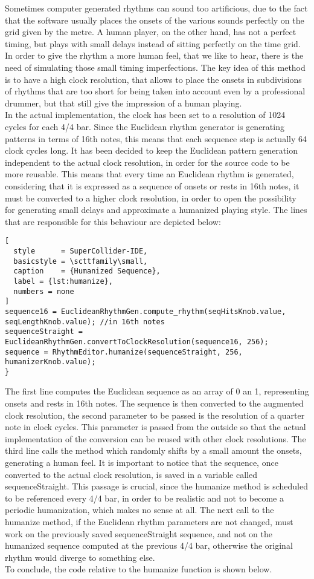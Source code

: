 \documentclass[main.tex]{subfiles}
\begin{document}
Sometimes computer generated rhythms can sound too artificious, due to the fact that the software usually places the onsets of the various sounds perfectly on the grid given by the metre. A human player, on the other hand, has not a perfect timing, but plays with small delays instead of sitting perfectly on the time grid. In order to give the rhythm a more human feel, that we like to hear, there is the need of simulating those small timing imperfections.
The key idea of this method is to have a high clock resolution, that allows to place the onsets in subdivisions of rhythms that are too short for being taken into account even by a professional drummer, but that still give the impression of a human playing.\\
In the actual implementation, the clock has been set to a resolution of 1024 cycles for each 4/4 bar. Since the Euclidean rhythm generator is generating patterns in terms of 16th notes, this means that each sequence step is actually 64 clock cycles long. It has been decided to keep the Euclidean pattern generation independent to the actual clock resolution, in order for the source code to be more reusable. This means that every time an Euclidean rhythm is generated, considering that it is expressed as a sequence of onsets or rests in 16th notes, it must be converted to a higher clock resolution, in order to open the possibility for generating small delays and approximate a humanized playing style. The lines that are responsible for this behaviour are depicted below:

\begin{lstlisting}[
  style      = SuperCollider-IDE,
  basicstyle = \scttfamily\small,
  caption    = {Humanized Sequence},
  label = {lst:humanize},
  numbers = none
]
sequence16 = EuclideanRhythmGen.compute_rhythm(seqHitsKnob.value, seqLengthKnob.value); //in 16th notes
sequenceStraight = EuclideanRhythmGen.convertToClockResolution(sequence16, 256);
sequence = RhythmEditor.humanize(sequenceStraight, 256, humanizerKnob.value);
}
\end{lstlisting} 
The first line computes the Euclidean sequence as an array of 0 an 1, representing onsets and rests in 16th notes. The sequence is then converted to the augmented clock resolution, the second parameter to be passed is the resolution of a quarter note in clock cycles. This parameter is passed from the outside so that the actual implementation of the conversion can be reused with other clock resolutions. The third line calls the method which randomly shifts by a small amount the onsets, generating a human feel. It is important to notice that the sequence, once converted to the actual clock resolution, is saved in a variable called sequenceStraight. This passage is crucial, since the humanize method is scheduled to be referenced every 4/4 bar, in order to be realistic and not to become a periodic humanization, which makes no sense at all. The next call to the humanize method, if the Euclidean rhythm parameters are not changed, must work on the previously saved sequenceStraight sequence, and not on the humanized sequence computed at the previous 4/4 bar, otherwise the original rhythm would diverge to something else.\\
To conclude, the code relative to the humanize function is shown below.
\end{document}
